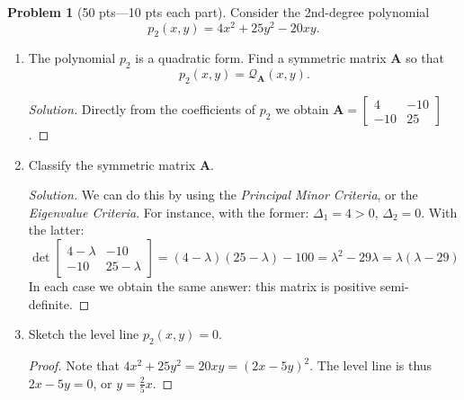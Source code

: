 \documentclass[12pt]{article}
\theoremstyle{definition}
\newtheorem{problem}{Problem}
\begin{document}
\bigskip
\begin{problem}[50 pts---10 pts each part]
Consider the 2nd-degree polynomial 
\begin{equation*}
p_2(x,y) = 4x^2 + 25y^2 - 20xy.
\end{equation*}
\begin{enumerate}
  \item The polynomial $p_2$ is a quadratic form.  Find a symmetric matrix $\boldsymbol{A}$ so that 
  \begin{equation*}
  p_2(x,y) = \mathcal{Q}_{\boldsymbol{A}}(x,y).
  \end{equation*}
  \begin{proof}[Solution] Directly from the coefficients of $p_2$ we obtain $ \boldsymbol{A} = \begin{bmatrix} 4 & -10 \\ -10 & 25 \end{bmatrix}$.\end{proof}
  \item Classify the symmetric matrix $\boldsymbol{A}$.
  \begin{proof}[Solution]
  We can do this by using the \emph{Principal Minor Criteria}, or the \emph{Eigenvalue Criteria}.
  For instance, with the former: $\Delta_1 = 4 > 0$, $\Delta_2 = 0$.
  With the latter:
  \begin{equation*}
  \det \begin{bmatrix} 4-\lambda & -10 \\ -10 & 25-\lambda \end{bmatrix} = (4-\lambda)(25-\lambda) - 100 = \lambda^2-29\lambda = \lambda(\lambda-29)
  \end{equation*}
  In each case we obtain the same answer: this matrix is positive semi-definite. \end{proof}
  \item Sketch the level line $p_2(x,y) = 0$.  
  \begin{proof} Note that $4x^2+25y^2=20xy = (2x-5y)^2$.  The level line is thus $2x-5y=0$, or $y=\tfrac{2}{5}x$.\end{proof}
  \begin{center}

\end{center}
\end{enumerate}
\end{problem}
\end{document}
